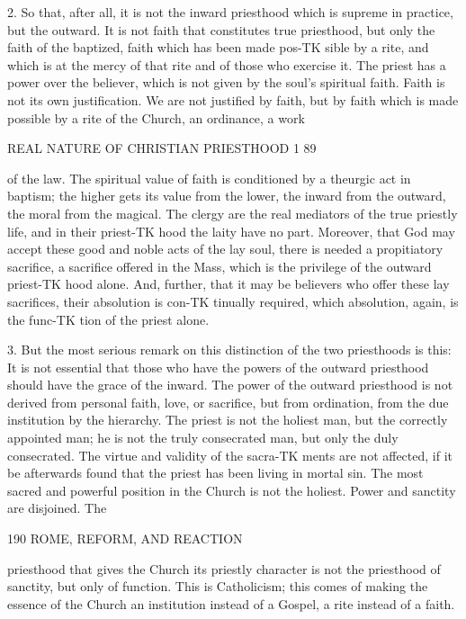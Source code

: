 \documentclass[12pt,a5paper,oneside]{book}
\begin{document}
{2. So that, after all, it is not the inward priesthood 
which is supreme in practice, but the outward. It is 
not faith that constitutes true priesthood, but only the 
faith of the baptized, faith which has been made pos-TK
sible by a rite, and which is at the mercy of that rite 
and of those who exercise it. The priest has a power 
over the believer, which is not given by the soul's 
spiritual faith. Faith is not its own justification. We 
are not justified by faith, but by faith which is made 
possible by a rite of the Church, an ordinance, a work 



REAL NATURE OF CHRISTIAN PRIESTHOOD 1 89 

of the law. The spiritual value of faith is conditioned 
by a theurgic act in baptism; the higher gets its 
value from the lower, the inward from the outward, 
the moral from the magical. The clergy are the real 
mediators of the true priestly life, and in their priest-TK
hood the laity have no part. Moreover, that God may 
accept these good and noble acts of the lay soul, there 
is needed a propitiatory sacrifice, a sacrifice offered in 
the Mass, which is the privilege of the outward priest-TK
hood alone. And, further, that it may be believers 
who offer these lay sacrifices, their absolution is con-TK
tinually required, which absolution, again, is the func-TK
tion of the priest alone. 

3. But the most serious remark on this distinction 
of the two priesthoods is this: It is not essential that 
those who have the powers of the outward priesthood 
should have the grace of the inward. The power of 
the outward priesthood is not derived from personal 
faith, love, or sacrifice, but from ordination, from the 
due institution by the hierarchy. The priest is not 
the holiest man, but the correctly appointed man; he 
is not the truly consecrated man, but only the duly 
consecrated. The virtue and validity of the sacra-TK
ments are not affected, if it be afterwards found that 
the priest has been living in mortal sin. The most 
sacred and powerful position in the Church is not the 
holiest. Power and sanctity are disjoined. The 



190 ROME, REFORM, AND REACTION 

priesthood that gives the Church its priestly character 
is not the priesthood of sanctity, but only of function. 
This is Catholicism; this comes of making the 
essence of the Church an institution instead of a 
Gospel, a rite instead of a faith. 

}
\end{document}
